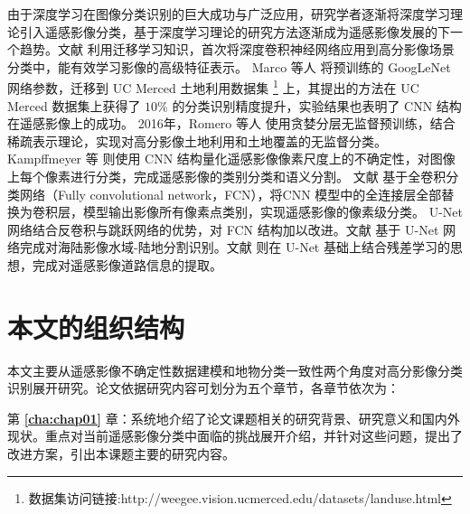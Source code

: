 % 

由于深度学习在图像分类识别的巨大成功与广泛应用，研究学者逐渐将深度学习理论引入遥感影像分类，基于深度学习理论的研究方法逐渐成为遥感影像发展的下一个趋势。文献 \cite{hu2015transferring} 利用迁移学习知识，首次将深度卷积神经网络应用到高分影像场景分类中，能有效学习影像的高级特征表示。 Marco 等人 \cite{castelluccio2015land} 将预训练的 GoogLeNet 网络参数，迁移到 UC Merced 土地利用数据集 \footnote{数据集访问链接:http://weegee.vision.ucmerced.edu/datasets/landuse.html} 上，其提出的方法在 UC Merced 数据集上获得了 $10\%$ 的分类识别精度提升，实验结果也表明了 CNN 结构在遥感影像上的成功。 2016年，Romero 等人 \cite{romero2016unsupervised} 使用贪婪分层无监督预训练，结合稀疏表示理论，实现对高分影像土地利用和土地覆盖的无监督分类。 Kampffmeyer 等 \cite{kampffmeyer2016semantic} 则使用 CNN 结构量化遥感影像像素尺度上的不确定性，对图像上每个像素进行分类，完成遥感影像的类别分类和语义分割。 文献 \cite{maggiori2016fully} 基于全卷积分类网络（Fully convolutional network，FCN），将CNN 模型中的全连接层全部替换为卷积层，模型输出影像所有像素点类别，实现遥感影像的像素级分类。 U-Net \cite{ronneberger2015u} 网络结合反卷积与跳跃网络的优势，对 FCN 结构加以改进。文献 \cite{li2018deepunet} 基于 U-Net 网络完成对海陆影像水域-陆地分割识别。文献 \cite{zhang2018road} 则在 U-Net 基础上结合残差学习的思想，完成对遥感影像道路信息的提取。



\section{本文的组织结构}
\label{sec:third}
本文主要从遥感影像不确定性数据建模和地物分类一致性两个角度对高分影像分类识别展开研究。论文依据研究内容可划分为五个章节，各章节依次为：

第 \textbf{\ref{cha:chap01}} 章：系统地介绍了论文课题相关的研究背景、研究意义和国内外现状。重点对当前遥感影像分类中面临的挑战展开介绍，并针对这些问题，提出了改进方案，引出本课题主要的研究内容。

